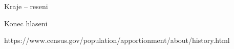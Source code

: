 \documentclass[17pt]{beamer}
\begin{document}
\begin{frame}{Kraje -- reseni}

\end{frame}

\begin{frame}{Konec hlaseni}

\end{frame}

https://www.census.gov/population/apportionment/about/history.html
\end{document}
